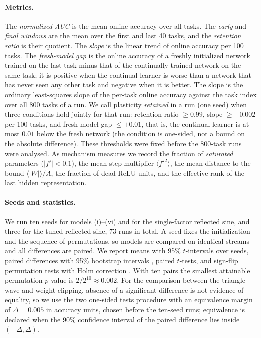 \documentclass[11pt,a4paper]{article}
\begin{document}
\paragraph{Metrics.} The \emph{normalized AUC} is the mean online accuracy over all tasks. The \emph{early} and
\emph{final windows} are the mean over the first and last 40 tasks, and the \emph{retention ratio} is their
quotient. The \emph{slope} is the linear trend of online accuracy per 100 tasks. The \emph{fresh-model gap} is
the online accuracy of a freshly initialized network trained on the last task minus that of the continually
trained network on the same task; it is positive when the continual learner is worse than a network that has
never seen any other task and negative when it is better. The slope is the ordinary least-squares slope of the
per-task online accuracy against the task index over all 800 tasks of a run. We call plasticity
\emph{retained} in a run (one seed) when three conditions hold jointly for that run: retention ratio
$\ge0.99$, slope $\ge-0.002$ per 100 tasks, and fresh-model gap $\le+0.01$, that is, the continual learner is at
most $0.01$ below the fresh network (the condition is one-sided, not a bound on the absolute difference). These thresholds
were fixed before the 800-task runs were analysed. As mechanism measures we record the fraction of
\emph{saturated} parameters ($|f'|<0.1$), the mean step multiplier $\langle f'^2\rangle$, the mean distance to
the bound $\langle|W|\rangle/A$, the fraction of dead ReLU units, and the effective rank \citep{roy2007effective}
of the last hidden representation.

\paragraph{Seeds and statistics.} We run ten seeds for models (i)--(vi) and for the single-factor reflected sine, and three for the tuned
reflected sine, 73 runs in total. A seed fixes the initialization and the sequence of permutations, so models are compared on
identical streams and all differences are paired. We report means with 95\% $t$-intervals over seeds, paired
differences with 95\% bootstrap intervals \citep{efron1993introduction}, paired $t$-tests, and sign-flip
permutation tests with Holm correction \citep{holm1979simple}. With ten pairs the smallest attainable
permutation $p$-value is $2/2^{10}\approx0.002$. For the comparison between the triangle wave and weight
clipping, absence of a significant difference is not evidence of equality, so we use the two one-sided tests
procedure \citep{schuirmann1987comparison,lakens2017equivalence} with an equivalence margin of
$\Delta=0.005$ in accuracy units, chosen before the ten-seed runs; equivalence is declared when the 90\%
confidence interval of the paired difference lies inside $(-\Delta,\Delta)$.
\end{document}
